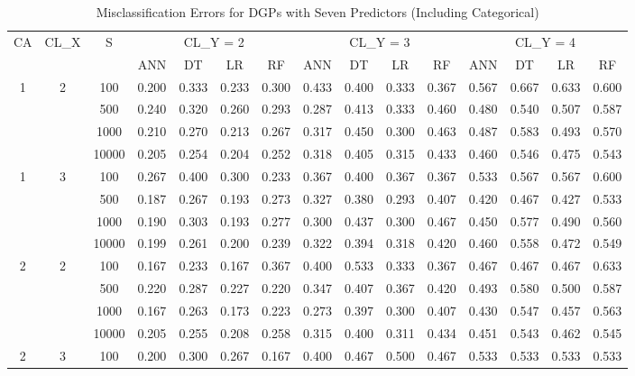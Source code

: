\documentclass[12pt]{article}
\begin{document}
{\small
\setlength{\tabcolsep}{3pt}
\renewcommand{\arraystretch}{1}
\begin{longtable}{ccccccccccccccc}
    \caption{\normalsize{Misclassification Errors for DGPs with Seven Predictors (Including Categorical)}} \\
    \hline
    CA & CL\_X & S & \multicolumn{4}{c}{CL\_Y = 2} & \multicolumn{4}{c}{CL\_Y = 3} & \multicolumn{4}{c}{CL\_Y = 4} \\
    \cline{4-15}
    & & & ANN & DT & LR & RF & ANN & DT & LR & RF & ANN & DT & LR & RF \\
    \hline
    1 & 2 & 100 & 0.200 & 0.333 & 0.233 & 0.300 & 0.433 & 0.400 & 0.333 & 0.367 & 0.567 & 0.667 & 0.633 & 0.600 \\
      &   & 500 & 0.240 & 0.320 & 0.260 & 0.293 & 0.287 & 0.413 & 0.333 & 0.460 & 0.480 & 0.540 & 0.507 & 0.587 \\
      &   & 1000 & 0.210 & 0.270 & 0.213 & 0.267 & 0.317 & 0.450 & 0.300 & 0.463 & 0.487 & 0.583 & 0.493 & 0.570 \\
      &   & 10000 & 0.205 & 0.254 & 0.204 & 0.252 & 0.318 & 0.405 & 0.315 & 0.433 & 0.460 & 0.546 & 0.475 & 0.543 \\
    \hline
    1 & 3 & 100 & 0.267 & 0.400 & 0.300 & 0.233 & 0.367 & 0.400 & 0.367 & 0.367 & 0.533 & 0.567 & 0.567 & 0.600 \\
      &   & 500 & 0.187 & 0.267 & 0.193 & 0.273 & 0.327 & 0.380 & 0.293 & 0.407 & 0.420 & 0.467 & 0.427 & 0.533 \\
      &   & 1000 & 0.190 & 0.303 & 0.193 & 0.277 & 0.300 & 0.437 & 0.300 & 0.467 & 0.450 & 0.577 & 0.490 & 0.560 \\
      &   & 10000 & 0.199 & 0.261 & 0.200 & 0.239 & 0.322 & 0.394 & 0.318 & 0.420 & 0.460 & 0.558 & 0.472 & 0.549 \\
    \hline
    2 & 2 & 100 & 0.167 & 0.233 & 0.167 & 0.367 & 0.400 & 0.533 & 0.333 & 0.367 & 0.467 & 0.467 & 0.467 & 0.633 \\
      &   & 500 & 0.220 & 0.287 & 0.227 & 0.220 & 0.347 & 0.407 & 0.367 & 0.420 & 0.493 & 0.580 & 0.500 & 0.587 \\
      &   & 1000 & 0.167 & 0.263 & 0.173 & 0.223 & 0.273 & 0.397 & 0.300 & 0.407 & 0.430 & 0.547 & 0.457 & 0.563 \\
      &   & 10000 & 0.205 & 0.255 & 0.208 & 0.258 & 0.315 & 0.400 & 0.311 & 0.434 & 0.451 & 0.543 & 0.462 & 0.545 \\
    \hline
    2 & 3 & 100 & 0.200 & 0.300 & 0.267 & 0.167 & 0.400 & 0.467 & 0.500 & 0.467 & 0.533 & 0.533 & 0.533 & 0.533 \\

\end{longtable}}
\end{document}

